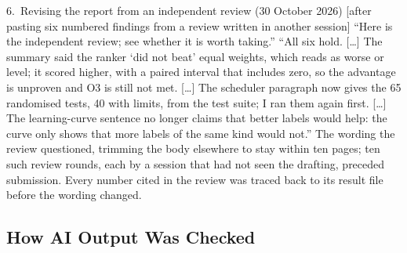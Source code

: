 \begin{exchange}{6.\ Revising the report from an independent review (30 October 2026)}
 [after pasting six numbered findings from a review written in another session] ``Here is the independent review; see whether it is worth taking.''
 ``All six hold. [\ldots] The summary said the ranker `did not beat' equal weights, which reads as worse or level; it scored higher, with a paired interval that includes zero, so the advantage is unproven and O3 is still not met. [\ldots] The scheduler paragraph now gives the 65 randomised tests, 40 with limits, from the test suite; I ran them again first. [\ldots] The learning-curve sentence no longer claims that better labels would help: the curve only shows that more labels of the same kind would not.''
 The wording the review questioned, trimming the body elsewhere to stay within ten pages; ten such review rounds, each by a session that had not seen the drafting, preceded submission.
 Every number cited in the review was traced back to its result file before the wording changed.
\end{exchange}

\subsection{How AI Output Was Checked}

